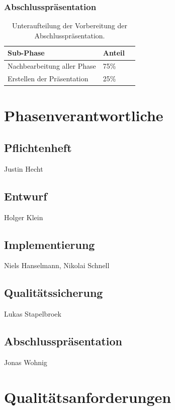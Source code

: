 \documentclass[a4paper]{scrreprt}
\begin{document}
\subsection{Abschlusspräsentation}
\begin{table}[H]
\centering
  \begin{tabular}{|p{3cm}|P{2cm}|P{2cm}|}
    Sub-Phase & Anteil \\ \hline
    Nachbearbeitung aller Phase& 75\% \\ \hline
    Erstellen der Präsentation & 25\% \\
  \end{tabular}
  \newline\newline
  \caption{Unteraufteilung der Vorbereitung der Abschlusspräsentation.}\label{qs}
\end{table}


\chapter{Phasenverantwortliche}
\section{Pflichtenheft} Justin Hecht
\section{Entwurf} Holger Klein 
\section{Implementierung} Niels Hanselmann, Nikolai Schnell
\section{Qualitätssicherung} Lukas Stapelbroek
\section{Abschlusspräsentation} Jonas Wohnig


\chapter{Qualitätsanforderungen}
\end{document}
